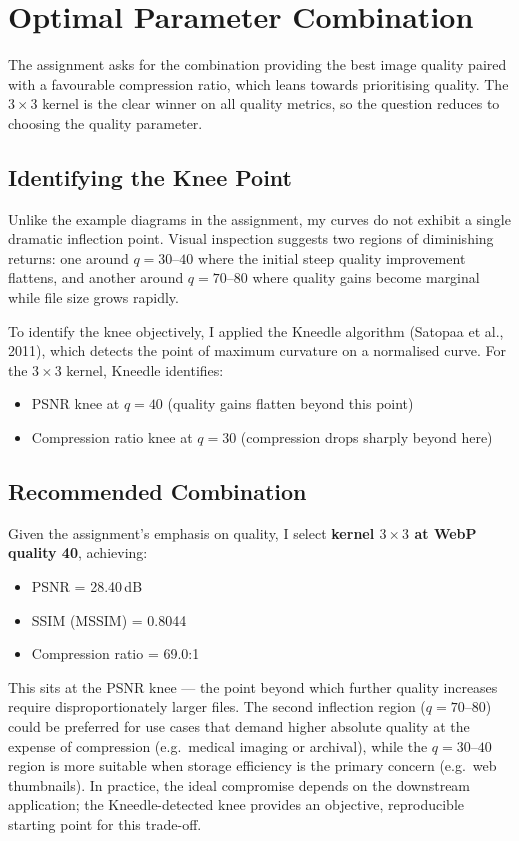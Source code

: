 \documentclass[11pt,a4paper]{article}
\begin{document}
\section*{Optimal Parameter Combination}
The assignment asks for the combination providing the best image quality paired with a favourable compression ratio, which leans towards prioritising quality.
The $3\times3$ kernel is the clear winner on all quality metrics, so the question reduces to choosing the quality parameter.

\subsection*{Identifying the Knee Point}
Unlike the example diagrams in the assignment, my curves do not exhibit a single dramatic inflection point.
Visual inspection suggests two regions of diminishing returns: one around $q=30$--$40$ where the initial steep quality improvement flattens, and another around $q=70$--$80$ where quality gains become marginal while file size grows rapidly.

To identify the knee objectively, I applied the Kneedle algorithm (Satopaa et al., 2011), which detects the point of maximum curvature on a normalised curve.
For the $3\times3$ kernel, Kneedle identifies:
\begin{itemize}[leftmargin=*]
    \item PSNR knee at $q=40$ (quality gains flatten beyond this point)
    \item Compression ratio knee at $q=30$ (compression drops sharply beyond here)
\end{itemize}

\subsection*{Recommended Combination}
Given the assignment's emphasis on quality, I select \textbf{kernel $3\times3$ at WebP quality 40}, achieving:
\begin{itemize}[leftmargin=*]
    \item PSNR = 28.40\,dB
    \item SSIM (MSSIM) = 0.8044
    \item Compression ratio = 69.0:1
\end{itemize}

This sits at the PSNR knee --- the point beyond which further quality increases require disproportionately larger files.
The second inflection region ($q=70$--$80$) could be preferred for use cases that demand higher absolute quality at the expense of compression (e.g.\ medical imaging or archival), while the $q=30$--$40$ region is more suitable when storage efficiency is the primary concern (e.g.\ web thumbnails).
In practice, the ideal compromise depends on the downstream application; the Kneedle-detected knee provides an objective, reproducible starting point for this trade-off.
\end{document}
